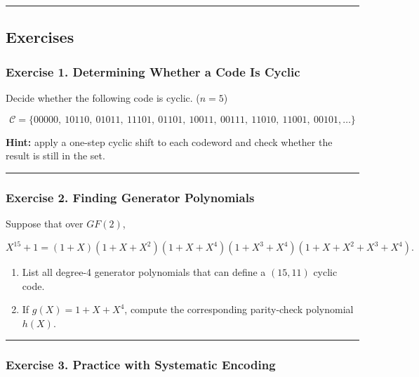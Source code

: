 \documentclass[
]{article}
\begin{document}
\begin{center}\rule{0.5\linewidth}{0.5pt}\end{center}

\subsection{Exercises}\label{exercises}

\subsubsection{Exercise 1. Determining Whether a Code Is
Cyclic}\label{exercise-1.-determining-whether-a-code-is-cyclic}

Decide whether the following code is cyclic. (\(n=5\))

\[\mathcal{C} = \{00000,\ 10110,\ 01011,\ 11101,\ 01101,\ 10011,\ 00111,\ 11010,\ 11001,\ 00101, \dots\}\]

\textbf{Hint:} apply a one-step cyclic shift to each codeword and check
whether the result is still in the set.

\begin{center}\rule{0.5\linewidth}{0.5pt}\end{center}

\subsubsection{Exercise 2. Finding Generator
Polynomials}\label{exercise-2.-finding-generator-polynomials}

Suppose that over \(GF(2)\),

\[X^{15} + 1 = (1+X)(1+X+X^2)(1+X+X^4)(1+X^3+X^4)(1+X+X^2+X^3+X^4).\]

\begin{enumerate}
\def\labelenumi{(\alph{enumi})}
\item
  List all degree-4 generator polynomials that can define a \((15,11)\)
  cyclic code.
\item
  If \(g(X)=1+X+X^4\), compute the corresponding parity-check polynomial
  \(h(X)\).
\end{enumerate}

\begin{center}\rule{0.5\linewidth}{0.5pt}\end{center}

\subsubsection{Exercise 3. Practice with Systematic
Encoding}\label{exercise-3.-practice-with-systematic-encoding}
\end{document}
